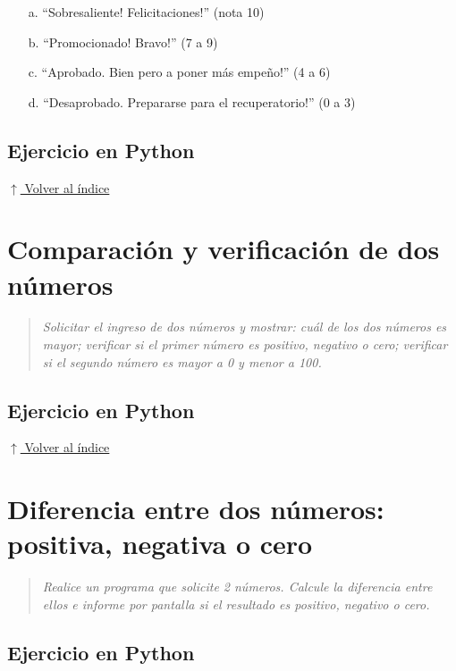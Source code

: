 \documentclass[12pt]{article}
\newcommand{\codigopython}[2]{%
}
\newcommand{\volverindice}{%
    \vspace{1em}%
    \begin{flushright}%
        \hyperlink{indice}{\small $\uparrow$ Volver al índice}%
    \end{flushright}%
}
\newcommand{\enunciado}[1]{%
    \begin{quote}
        \itshape #1
    \end{quote}
}
\begin{document}
\begin{itemize}[noitemsep]
    \item[a.] \enquote{Sobresaliente! Felicitaciones!} (nota 10)
    \item[b.] \enquote{Promocionado! Bravo!} (7 a 9)
    \item[c.] \enquote{Aprobado. Bien pero a poner más empeño!} (4 a 6)
    \item[d.] \enquote{Desaprobado. Prepararse para el recuperatorio!} (0 a 3)
\end{itemize}

\subsection*{Ejercicio en Python}

\codigopython{08}{Calificación según la nota del examen}

\volverindice
\newpage


\section{Comparación y verificación de dos números}

\enunciado{Solicitar el ingreso de dos números y mostrar: cuál de los dos números es mayor; verificar si el primer número es positivo, negativo o cero; verificar si el segundo número es mayor a 0 y menor a 100.}

\subsection*{Ejercicio en Python}

\codigopython{09}{Comparación y verificación de dos números}

\volverindice
\newpage


\section{Diferencia entre dos números: positiva, negativa o cero}

\enunciado{Realice un programa que solicite 2 números. Calcule la diferencia entre ellos e informe por pantalla si el resultado es positivo, negativo o cero.}

\subsection*{Ejercicio en Python}
\end{document}
